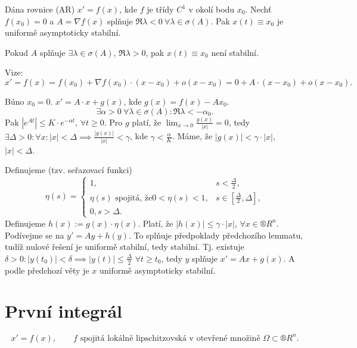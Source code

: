 \documentclass[12pt]{article}					%
\begin{document}
\begin{veta}
	Dána rovnice (AR) $x' = f(x)$, kde $f$ je třídy $C^1$ v okolí bodu $x_0$. Nechť $f(x_0) = 0$ a $A = \nabla f(x)$ splňuje $\Re \lambda < 0\ \forall \lambda \in \sigma(A)$. Pak $x(t) ≡ x_0$ je uniformě asymptoticky stabilní.

	Pokud $A$ splňuje $\exists \lambda \in \sigma(A)$, $\Re \lambda > 0$, pak $x(t) ≡ x_0$ není stabilní.

	\begin{dukazin}
		Vize:
		$$ x' = f(x) = f(x_0) + \nabla f(x_0)·(x - x_0) + o(x - x_0) = 0 + A·(x - x_0) + o(x - x_0). $$

		Búno $x_0 = 0$. $x' = A·x + g(x)$, kde $g(x) = f(x) - Ax_0$.
		$$ \exists \alpha > 0\ \forall \lambda \in \sigma(A): \Re \lambda < -\alpha_0. $$
		Pak $|e^{At}| ≤ K·e^{-\alpha t}$, $\forall t ≥ 0$. Pro $g$ platí, že $\lim_{x \rightarrow 0} \frac{g(x)}{|x|} = 0$, tedy $\exists \Delta > 0: \forall x: |x| < \Delta \implies \frac{|g(x)|}{|x|} < \gamma$, kde $\gamma < \frac{\alpha}{K}$. Máme, že $|g(x)| < \gamma·|x|$, $|x| < \Delta$.

		Definujeme (tzv. seřazovací funkci)
		$$ \eta(s) = \begin{cases}1,& s < \frac{\Delta}{2}, \\ \eta(s)\text{ spojitá, že} 0 < \eta(s) < 1, & s \in [\frac{\Delta}{2}, \Delta],\\ 0, s > \Delta. \end{cases} $$
		Definujeme $h(x) := g(x)·\eta(x)$. Platí, že $|h(x)| ≤ \gamma · |x|$, $\forall x \in ®R^n$. Podívejme se na $y' = A y + h(y)$. To splňuje předpoklady předchozího lemmatu, tudíž nulové řešení je uniformě stabilní, tedy stabilní. Tj. existuje $\delta > 0: |y(t_0)| < \delta \implies |y(t)| ≤ \frac{\Delta}{2}$ $\forall t ≥ t_0$, tedy $y$ splňuje $x' = Ax + g(x)$. A podle předchozí věty je $x$ uniformě asymptoticky stabilní.
	\end{dukazin}
\end{veta}


\section{První integrál}

\begin{definice}[AR]
	$$ x' = f(x), \qquad f \text{ spojitá lokálně lipschitzovská v otevřené množině } \Omega \subset ®R^n. $$
\end{definice}
\end{document}
